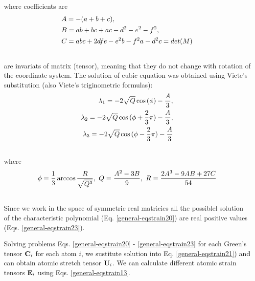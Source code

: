\documentclass[letterpaper,10pt,english]{sphinxmanual}
\begin{document}
where coefficients are
\begin{gather}
\begin{split}\begin{split}
&A = -(a + b + c), \\
&B = ab + bc + ac - d^2 - e^2 - f^2,\\
&C = abc + 2dfe - e^2b - f^2a - d^2c = det(M)
\end{split}\end{split}\notag\\\begin{split}\end{split}\notag
\end{gather}
are invariats of matrix (tensor), meaning that they do not change with rotation of the coordinate system. The solution of cubic equation was obtained using Viete's substitution (also Viete's triginometric formulas):
\label{general:equation-eqstrain23}\begin{gather}
\begin{split}\begin{split}
\lambda_1 = -2\sqrt{Q}\cos{(\phi)} - \frac{A}{3}, \\
\lambda_2 = -2\sqrt{Q}\cos{(\phi + \frac{2}{3}\pi)} - \frac{A}{3}, \\
\lambda_3 = -2\sqrt{Q}\cos{(\phi - \frac{2}{3}\pi)} - \frac{A}{3}
\end{split}\end{split}\label{general-eqstrain23}\\\begin{split}\end{split}\notag
\end{gather}
where
\begin{gather}
\begin{split}\phi = \frac{1}{3}\arccos{\frac{R}{\sqrt{Q^3}}}, ~Q = \frac{A^2 - 3B}{9}, ~R = \frac{2A^3 - 9AB + 27C}{54}\end{split}\notag\\\begin{split}\end{split}\notag
\end{gather}
Since we work in the space of symmetric real matricies all the possiblel solution of the characteristic polynomial (Eq. \eqref{general-eqstrain20}) are real positive values (Eqs. \eqref{general-eqstrain23}).

Solving problems Eqs. \eqref{general-eqstrain20} - \eqref{general-eqstrain23} for each Green's tensor ${\bf C}_i$ for each atom $i$, we sustitute solution into Eq. \eqref{general-eqstrain21}) and can obtain atomic stretch tensor ${\bf U}_i$. We can calculate different atomic strain tensors ${\bf E}_i$ using Eqs. \eqref{general-eqstrain13}.
\end{document}

